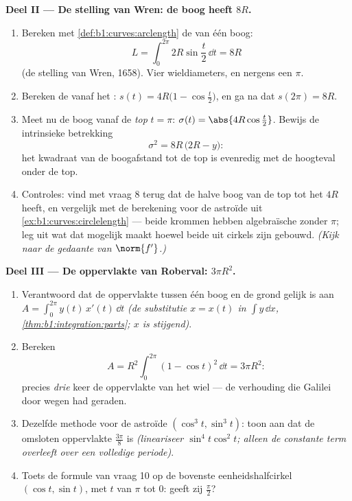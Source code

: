 \begin{problem}
\medskip
\noindent\textbf{Deel II --- De stelling van Wren: de boog heeft
 $8R$.}
\begin{enumerate}[resume]
  \item Bereken met \cref{def:b1:curves:arclength} de  van
        één boog:
        \[
        L = \int_0^{2\pi} 2R\sin\frac t2\,\dd t = 8R
        \]
        (de stelling van Wren, 1658). Vier wieldiameters, en nergens
        een $\pi$.
  \item Bereken de  vanaf het : $s(t) =
        4R\bigl(1 - \cos\frac t2\bigr)$, en ga na dat $s(2\pi) =
        8R$.
  \item Meet nu de boog vanaf de \emph{top} $t = \pi$: $\sigma(t)
        = \abs{4R\cos\frac t2}$. Bewijs de intrinsieke betrekking
        \[
        \sigma^2 = 8R\,\bigl(2R - y\bigr) :
        \]
        het kwadraat van de boogafstand tot de top is evenredig met
        de hoogteval onder de top.
  \item Controles: vind met vraag 8 terug dat de halve boog van de
        top tot het   $4R$ heeft, en vergelijk met de
        berekening voor de astroïde uit
        \cref{ex:b1:curves:circlelength} --- beide krommen hebben
        algebraïsche  zonder $\pi$; leg uit wat dat mogelijk
        maakt hoewel beide uit cirkels zijn gebouwd. \emph{(Kijk
        naar de gedaante van $\norm{f'}$.)}
\end{enumerate}

\medskip
\noindent\textbf{Deel III --- De oppervlakte van Roberval: $3\pi
R^2$.}
\begin{enumerate}[resume]
  \item Verantwoord dat de oppervlakte tussen één boog en de grond
        gelijk is aan $A = \int_0^{2\pi} y(t)\,x'(t)\,\dd t$
        \emph{(de substitutie $x = x(t)$ in $\int y\,\dd x$,
        \cref{thm:b1:integration:parts}; $x$ is stijgend)}.
  \item Bereken
        \[
        A = R^2\int_0^{2\pi}(1 - \cos t)^2\,\dd t = 3\pi R^2 :
        \]
        precies \emph{drie} keer de oppervlakte van het wiel --- de
        verhouding die Galilei door wegen had geraden.
  \item Dezelfde methode voor de astroïde $(\cos^3t, \sin^3t)$:
        toon aan dat de omsloten oppervlakte $\frac{3\pi}8$ is
        \emph{(lineariseer $\sin^4 t\cos^2 t$; alleen de constante
        term overleeft over een volledige periode)}.
  \item Toets de formule van vraag 10 op de bovenste
        eenheidshalfcirkel $(\cos t, \sin t)$, met $t$ van $\pi$
        tot $0$: geeft zij $\frac\pi2$?
\end{enumerate}


\end{problem}

